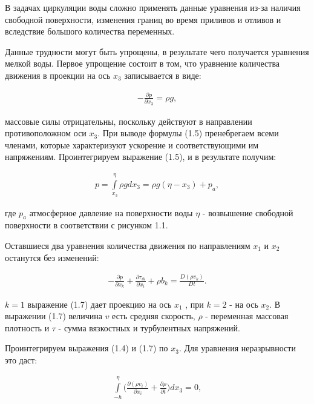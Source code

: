 \documentclass[14pt]{extreport}
\begin{document}
В задачах циркуляции воды сложно применять данные уравнения из-за наличия свободной поверхности, изменения границ во время приливов и отливов и вследствие большого количества переменных.

Данные трудности могут быть упрощены, в результате чего получается уравнения мелкой воды. Первое упрощение состоит в том, что уравнение количества движения в проекции на ось $ x_3 $ записывается в виде:

\begin{gather}
-\frac{\partial p}{\partial x_3}=\rho g, 
\end{gather}

 массовые силы отрицательны, поскольку действуют в направлении противоположном оси $ x_3 $. При выводе формулы (1.5) пренебрегаем всеми членами, которые характеризуют ускорение и соответствующими им напряжениям. Проинтегрируем выражение (1.5), и в результате получим:

\begin{gather}
p = \int\limits^\eta_{x_3} \rho g dx_3 = \rho g (\eta-x_3)+p_a,
\end{gather}

\noindent где $p_a$ атмосферное давление на поверхности воды
$\eta$ - возвышение свободной поверхности в соответствии с рисунком 1.1.


Оставшиеся два уравнения количества движения по направлениям $x_1$ и $x_2$ останутся без изменений:

\begin{gather}
-\frac{\partial p}{\partial x_k} + \frac{\partial \tau_{ik}}{\partial x_i} + \rho b_k = \frac{D(\rho v_k)}{Dt}.
\end{gather}

 $k=1$ выражение (1.7) дает проекцию на ось $ x_1 $ , при $k=2$ - на ось $ x_2 $. В выражении (1.7) величина $v$ есть средняя скорость, $\rho$ - переменная массовая плотность и $\tau$ - сумма вязкостных и турбулентных напряжений.

Проинтегрируем выражения (1.4) и (1.7) по $ x_3 $. Для уравнения неразрывности это даст:

\begin{gather}
\int\limits^\eta_{-h} \bigg(\frac{\partial (\rho v_i)}{\partial x_i} + \frac{\partial \rho}{\partial t}\bigg) dx_3 =0,
\end{gather}
\end{document}
